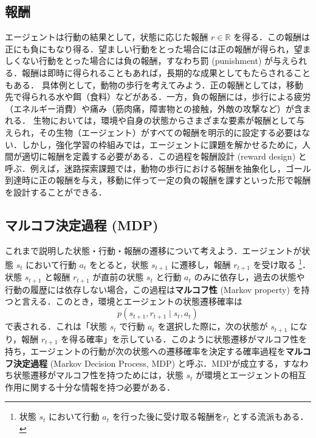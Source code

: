 \subsection{報酬}
エージェントは行動の結果として，状態に応じた報酬 $r \in \mathbb{R}$ を得る．この報酬は正にも負にもなり得る．望ましい行動をとった場合には正の報酬が得られ，望ましくない行動をとった場合には負の報酬，すなわち罰 (punishment) が与えられる．報酬は即時に得られることもあれば，長期的な成果としてもたらされることもある．
具体例として，動物の歩行を考えてみよう．正の報酬としては，移動先で得られる水や餌（食料）などがある．一方，負の報酬には，歩行による疲労（エネルギー消費）や痛み（筋肉痛，障害物との接触，外敵の攻撃など）が含まれる．
生物においては，環境や自身の状態からさまざまな要素が報酬として与えられ，その生物（エージェント）がすべての報酬を明示的に設定する必要はない．しかし，強化学習の枠組みでは，エージェントに課題を解かせるために，人間が適切に報酬を定義する必要がある．この過程を報酬設計 (reward design) と呼ぶ．例えば，迷路探索課題では，動物の歩行における報酬を抽象化し，ゴール到達時に正の報酬を与え，移動に伴って一定の負の報酬を課すといった形で報酬を設計することができる．
\subsection{マルコフ決定過程 (MDP)}
これまで説明した状態・行動・報酬の遷移について考えよう．エージェントが状態 $s_t$ において行動 $a_t$ をとると，状態 $s_{t+1}$ に遷移し，報酬 $r_{t+1}$ を受け取る \footnote{状態 $s_t$ において行動 $a_t$ を行った後に受け取る報酬を$r_t$ とする流派もある．}．状態 $s_{t+1}$ と報酬 $r_{t+1}$ が直前の状態 $s_t$ と行動 $a_t$ のみに依存し，過去の状態や行動の履歴には依存しない場合，この過程は\textbf{マルコフ性} (Markov property) を持つと言える．このとき，環境とエージェントの状態遷移確率は
\begin{equation}
p(s_{t+1}, r_{t+1} \mid s_t, a_t)
\end{equation}
で表される．これは「状態 $s_t$ で行動 $a_t$ を選択した際に，次の状態が $s_{t+1}$ になり，報酬 $r_{t+1}$ を得る確率」を示している．このように状態遷移がマルコフ性を持ち，エージェントの行動が次の状態への遷移確率を決定する確率過程を\textbf{マルコフ決定過程} (Markov Decision Process, MDP) と呼ぶ．MDPが成立する，すなわち状態遷移がマルコフ性を持つためには，状態 $s_t$ が環境とエージェントの相互作用に関する十分な情報を持つ必要がある．
